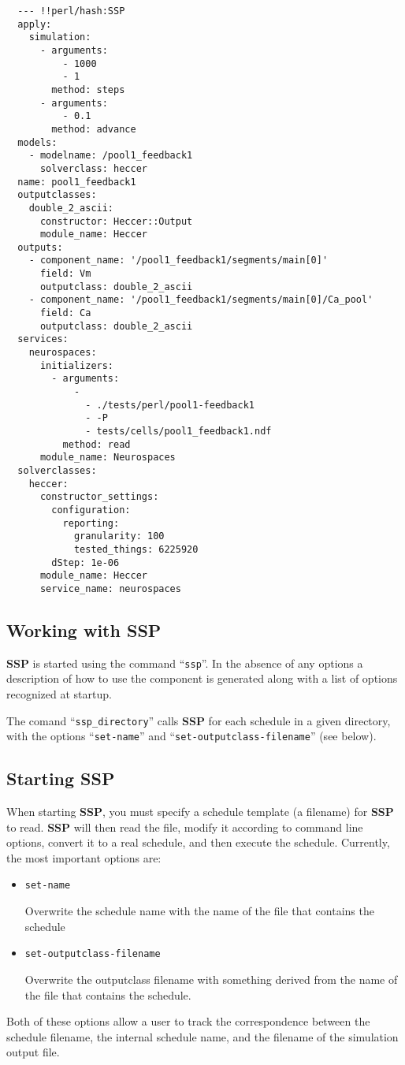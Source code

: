 \documentclass[12pt]{article}
\begin{document}
\begin{verbatim}
  --- !!perl/hash:SSP
  apply:
    simulation:
      - arguments:
          - 1000
          - 1
        method: steps
      - arguments:
          - 0.1
        method: advance
  models:
    - modelname: /pool1_feedback1
      solverclass: heccer
  name: pool1_feedback1
  outputclasses:
    double_2_ascii:
      constructor: Heccer::Output
      module_name: Heccer
  outputs:
    - component_name: '/pool1_feedback1/segments/main[0]'
      field: Vm
      outputclass: double_2_ascii
    - component_name: '/pool1_feedback1/segments/main[0]/Ca_pool'
      field: Ca
      outputclass: double_2_ascii
  services:
    neurospaces:
      initializers:
        - arguments:
            -
              - ./tests/perl/pool1-feedback1
              - -P
              - tests/cells/pool1_feedback1.ndf
          method: read
      module_name: Neurospaces
  solverclasses:
    heccer:
      constructor_settings:
        configuration:
          reporting:
            granularity: 100
            tested_things: 6225920
        dStep: 1e-06
      module_name: Heccer
      service_name: neurospaces
\end{verbatim}

\subsection*{Working with SSP}

{\bf SSP} is started using the command ``{\tt ssp}''. In the absence of any options a description of how to use the component is generated along with a list of options recognized at startup.

The comand ``{\tt ssp\_directory}'' calls {\bf SSP} for each schedule in a given directory, with the options ``{\tt set-name}'' and ``{\tt set-outputclass-filename}'' (see below).

\subsection*{Starting SSP}

When starting {\bf SSP}, you must specify a schedule template (a filename) for {\bf SSP} to read. {\bf SSP} will then read the file, modify it according to command line options, convert it to a real schedule, and then execute the schedule. Currently, the most important options are:
\begin{itemize}
\item[ ]{\tt set-name}

Overwrite the schedule name with the name of the file that contains the schedule
\item[ ]{\tt set-outputclass-filename}

Overwrite the outputclass filename with something derived from the name of the file that contains the schedule.
\end{itemize}
Both of these options allow a user to track the correspondence between the schedule filename, the internal schedule name, and the filename of the simulation output file.
\end{document}
